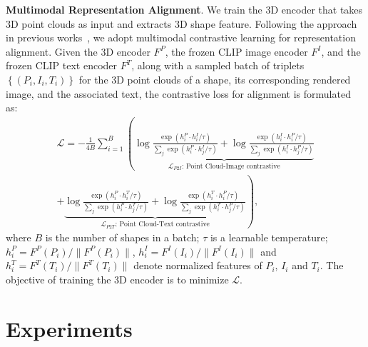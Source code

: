 \documentclass{article}
\begin{document}
\textbf{Multimodal Representation Alignment}.
We train the 3D encoder that takes  3D point clouds as input and extracts 3D shape feature. Following the approach in previous works~\cite{xue2023ulip,xue2023ulip2,liu2023openshape}, we adopt multimodal contrastive learning for representation alignment. Given the 3D encoder $F^P$, the frozen CLIP image encoder $F^I$, and the frozen CLIP text encoder $F^T$, along with a sampled batch of triplets $\left\{ (P_i, I_i, T_i)\right\}$ for the 3D point clouds of a shape, its corresponding rendered image, and the associated text, the contrastive loss for alignment is formulated as:
\begin{multline*}
    \mathcal{L} = -\frac{1}{4B}\sum_{i=1}^B \left(
    \underbrace{
    \log \frac{\exp(h_i^P \cdot h_i^I / \tau)}{\sum_j \exp (h_i^P \cdot h_j^I / \tau)} 
    + \log \frac{\exp(h_i^I \cdot h_i^P / \tau)}{\sum_j \exp (h_i^I \cdot h_j^P / \tau)}}_{\mathcal{L}_{P2I}\text{: Point Cloud-Image contrastive}} \right. \\ 
    \left.
    + \underbrace{\log \frac{\exp(h_i^P \cdot h_i^T / \tau)}{\sum_j \exp (h_i^P \cdot h_j^T / \tau)} 
    + \log \frac{\exp(h_i^T \cdot h_i^P / \tau)}{\sum_j \exp (h_i^T \cdot h_j^P / \tau)}}_{\mathcal{L}_{P2T}\text{: Point Cloud-Text contrastive}}
    \right),
\end{multline*}
where $B$ is the number of shapes in a batch; $\tau$ is a learnable temperature; $h_i^P = {F^P(P_i)} / {\|F^P(P_i)\|}$, $h_i^I = {F^I(I_i)}/{\|F^I(I_i)\|}$ and $h_i^T = {F^T(T_i)} / {\|F^T(T_i)\|}$ denote normalized features of $P_i$, $I_i$ and $T_i$.
The objective of training the 3D encoder is to minimize $\mathcal{L}$.



\section {Experiments}
\end{document}
